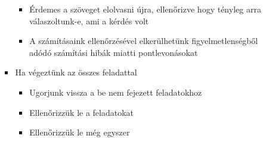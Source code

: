 \documentclass[../Main.tex]{subfiles}
\begin{document}
\begin{itemize}
\begin{itemize}
\begin{itemize}
            \begin{itemize}
                \item Érdemes a szöveget elolvasni újra, ellenőrizve hogy tényleg
                arra válaszoltunk-e, ami a kérdés volt
                \item A számításaink ellenőrzésével elkerülhetünk
                figyelmetlenségből adódó számítási hibák miatti
                pontlevonásokat
            \end{itemize}
            \item Ha végeztünk az összes feladattal
            \begin{itemize}
                \item Ugorjunk vissza a be nem fejezett feladatokhoz
                \item Ellenőrizzük le a feladatokat
                \item Ellenőrizzük le még egyszer
            \end{itemize}
        \end{itemize}
    \end{itemize}
\end{itemize}
\end{document}
